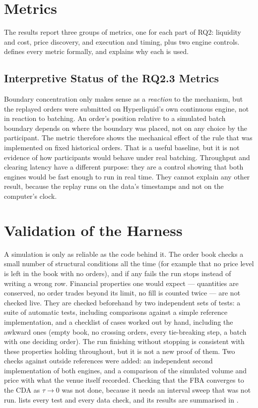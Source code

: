 \section{Metrics}
\label{sec:metrics}

The results report three groups of metrics, one for each part of RQ2: liquidity
and cost, price discovery, and execution and timing, plus two engine controls.
 defines every metric formally, and 
explains why each is used.

\subsection{Interpretive Status of the RQ2.3 Metrics}
\label{sec:testable}

Boundary concentration only makes sense as a \emph{reaction} to the
mechanism, but the replayed orders were submitted on Hyperliquid's own
continuous engine, not in reaction to batching. An order's position relative
to a simulated batch boundary depends on where the boundary was placed, not on
any choice by the participant. The metric therefore shows the mechanical effect
of the rule that was implemented on fixed historical orders. That is a useful
baseline, but it is not evidence of how participants would behave under real
batching. Throughput and clearing latency
have a different purpose: they are a control showing that both engines would
be fast enough to run in real time. They cannot explain any other result,
because the replay runs on the data's timestamps and not on the computer's
clock.

\section{Validation of the Harness}
\label{sec:validation}

A simulation is only as reliable as the code behind it. The order book checks a
small number of structural conditions all the time (for example that no price
level is left in the book with no orders), and if any fails the run stops
instead of writing a wrong row. Financial properties one would expect ---
quantities are conserved, no order trades beyond its limit, no fill is
counted twice --- are not checked live. They are checked beforehand by two
independent sets of tests: a suite of automatic tests, including comparisons
against a simple reference implementation, and a checklist of cases worked out
by hand, including the awkward ones (empty book, no crossing orders, every
tie-breaking step, a batch with one deciding order). The run finishing without
stopping is consistent with these properties holding throughout, but it is not
a new proof of them. Two checks against outside references were added: an
independent second implementation of both engines, and a comparison of the
simulated volume and price with what the venue itself recorded. Checking that
the FBA converges to the CDA as $\tau \to 0$ was not done, because it needs an
interval sweep that was not run.  lists every test and every
data check, and its results are summarised in .
